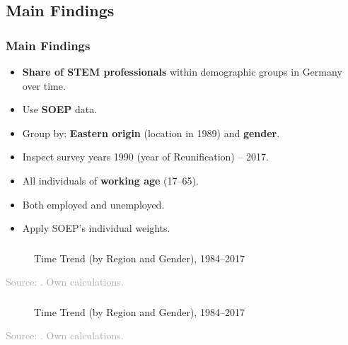 \documentclass[11pt, aspectratio=1610, xcolor={dvipsnames}]{beamer}
\newcommand{\highlight}[1]{\textbf{\textcolor{PineGreen}{#1}}}
\begin{document}
	\subsection{Main Findings}
	\begin{frame}
		\frametitle{Main Findings}
		
		\begin{itemize}
			\item \highlight{Share of STEM professionals} within demographic groups in Germany over time.
			\item Use \highlight{SOEP} data.
			\item Group by: \highlight{Eastern origin} (location in 1989) and \highlight{gender}.
			\item Inspect survey years 1990 (year of Reunification) -- 2017.
			\item All individuals of \highlight{working age} (17--65).
			\item Both employed and unemployed.
			\item Apply SOEP's individual weights.
		\end{itemize}
		
	\end{frame}
		
	\begin{frame}
		\frametitle{}
		
		\begin{figure}[h]
			\centering
			\caption{Time Trend (by Region and Gender), 1984--2017}
			\label{fig:trend}
			\resizebox{75mm}{!}{}
		\end{figure}
		
		{\scriptsize
			\textcolor{darkgray}{Source: \cite{SOEP2023}. Own calculations.}
		}
	
	\end{frame}
	
	\begin{frame}
		\frametitle{}
		
		\hypertarget{graph}{}
		
		\begin{figure}[h]
			\centering
			\caption{Time Trend (by Region and Gender), 1984--2017}
			\label{fig:trend_highlight}
			\resizebox{75mm}{!}{}
		\end{figure}
		
		{\scriptsize
			\textcolor{darkgray}{Source: \cite{SOEP2023}. Own calculations.}
		}
		
	\end{frame}
	
\end{document}
